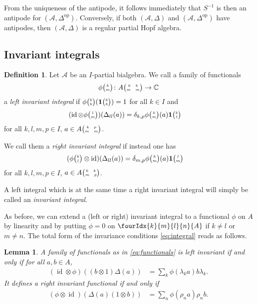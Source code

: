 \documentclass[10pt]{article}
\DeclareMathOperator{\id}{id}
\DeclareMathOperator{\op}{\mathrm{op}}
\newcommand{\C}{\mathbb{C}}
\newcommand{\Grt}[3]{#1{\tiny {\begin{pmatrix} #2\\#3\end{pmatrix}}}}
\newcommand{\UnitC}[2]{\Grt{\mathbf{1}}{#1}{#2}}
\newcommand{\pmat}[4]{{\tiny \begin{pmatrix} #1 \quad #2 \\ #3 \quad #4\end{pmatrix}}}
\newcommand{\Gr}[5]{\fourIdx{#2}{#4}{#3}{#5}{#1}}%
\newtheorem{Lem}[Theorem]{Lemma}
\theoremstyle{definition}
\newtheorem{Def}[Theorem]{Definition}
\newcommand{\phic}[2]{\Grt{\phi}{#1}{#2}}
\numberwithin{equation}{section}
\begin{document}
From the uniqueness of the antipode, it follows immediately that $S^{-1}$ is then an antipode for $(\mathscr{A},\Delta^{\op})$. Conversely, if both $(\mathscr{A},\Delta)$ and $(\mathscr{A},\Delta^{\op})$ have antipodes, then $(\mathscr{A},\Delta)$ is a regular partial Hopf algebra. 

\subsection{Invariant integrals}


\begin{Def}
  Let $\mathscr{A}$ be an $I$-partial bialgebra.  We call a family of
  functionals
\begin{align} \label{eq:functionals}
  \phic{k}{m} \colon A\pmat{k}{k}{m}{m} \to \C
\end{align}
a \emph{left invariant} \emph{integral} if
 $\phic{k}{k}(\UnitC{k}{k})=1$ for all $k\in
I$ and
\begin{align}
  \label{eq:integral}
   (\id \otimes \phic{l}{m})(\Delta_{ll}(a)) 
&= \delta_{k,p} \phic{k}{m}(a)
  \UnitC{k}{l} 
\end{align}
 for all $k,l,m,p\in I$, $a \in A\pmat{k}{p}{m}{m}$. 
 
 We call them a \emph{right invariant}  \emph{integral} if instead one has \begin{align}
  (\phic{k}{l} \otimes
  \id)(\Delta_{ll}(a))&= \delta_{m,p} \phic{k}{m}(a) \UnitC{l}{m}\end{align}
 for all $k,l,m,p\in I$, $a \in A\pmat{k}{k}{m}{p}$. 
 
 A left integral which is at the same time a right invariant integral will simply be called an \emph{invariant integral}.
\end{Def}

As before, we can extend a (left or right) invariant integral to a functional $\phi$ on $A$ by linearity and by putting $\phi=0$ on $\Gr{A}{k}{l}{m}{n}$ if $k\neq l$ or $m\neq n$. The total form of the invariance conditions
\eqref{eq:integral}  reads as follows. 

\begin{Lem} \label{lemma:total-integral}
  A family of functionals  as in   \eqref{eq:functionals}
  is left invariant
  if and only if
for all $a,b\in A$,
  \begin{align*}
(\id\otimes \phi)((b\otimes 1)\Delta(a)) &= \sum_{k}\phi(\lambda_{k}a)b\lambda_k.
      \end{align*}
      It defines a right invariant functional if and only if 
   \begin{align*}   (\phi\otimes \id)(\Delta(a)(1\otimes b)) &= \sum_{n}
\phi(\rho_{n} a)\rho_n b.\end{align*}
\end{Lem}
\end{document}
